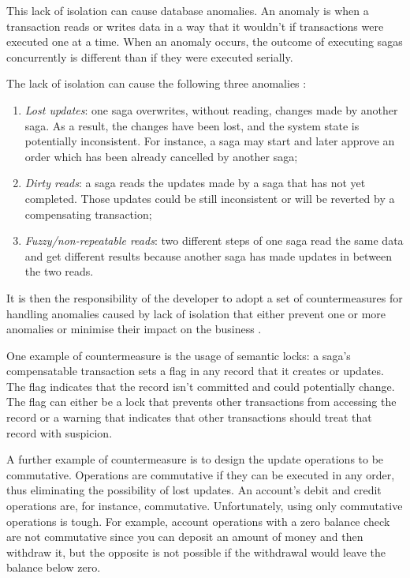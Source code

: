 \documentclass[conference]{IEEEtran}
\begin{document}
This lack of isolation can cause database anomalies. An anomaly is when a transaction reads or writes data in a way that it wouldn't if transactions were executed one at a time. When an anomaly occurs, the outcome of executing sagas concurrently is different than if they were executed serially.

The lack of isolation can cause the following three anomalies \cite{microservices-patterns-anomalies}:

\begin{enumerate}
  \item \textit{Lost updates}: one saga overwrites, without reading, changes made by another saga. As a result, the changes have been lost, and the system state is potentially inconsistent. For instance, a saga may start and later approve an order which has been already cancelled by another saga;
  \item \textit{Dirty reads}: a saga reads the updates made by a saga that has not yet completed. Those updates could be still inconsistent or will be reverted by a compensating transaction;
  \item \textit{Fuzzy/non-repeatable reads}: two different steps of one saga read the same data and get different results because another saga has made updates in between the two reads.
\end{enumerate}

It is then the responsibility of the developer to adopt a set of countermeasures for handling anomalies caused by lack of isolation that either prevent one or more anomalies or minimise their impact on the business \cite{semantic-acid}.

One example of countermeasure is the usage of semantic locks: a saga's compensatable transaction sets a flag in any record that it creates or updates. The flag indicates that the record isn't committed and could potentially change. The flag can either be a lock that prevents other transactions from accessing the record or a warning that indicates that other transactions should treat that record with suspicion.

A further example of countermeasure is to design the update operations to be commutative. Operations are commutative if they can be executed in any order, thus eliminating the possibility of lost updates. An account's debit and credit operations are, for instance, commutative. Unfortunately, using only commutative operations is tough. For example, account operations with a zero balance check are not commutative since you can deposit an amount of money and then withdraw it, but the opposite is not possible if the withdrawal would leave the balance below zero.
\end{document}
